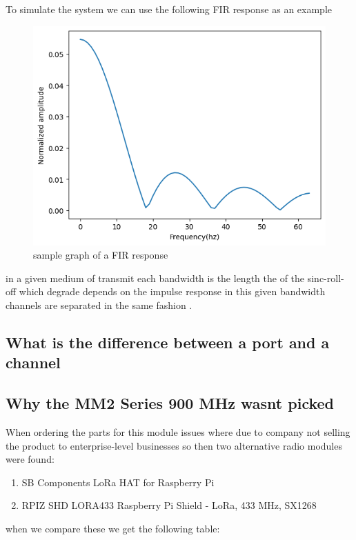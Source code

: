 To simulate the system we can use the following FIR response  as an example 
\begin{figure}[h!]
    \includegraphics[width=0.5\linewidth]{Images/FIR_response.png}
    \caption{sample graph of a FIR response}
    \label{sample graph of a FIR response}

\end{figure}
in a given  medium  of  transmit each bandwidth is the length the of the  sinc-roll-off which degrade depends on the  impulse response in this given bandwidth channels are separated in the same fashion .
\subsection{What is  the difference  between a  port and a channel}

\newpage
\subsection{Why the MM2 Series 900 MHz wasnt picked}
When ordering the parts for  this module issues where due to company not selling the product to  enterprise-level businesses so then two alternative radio modules were found:
\begin{enumerate}
    \item SB Components LoRa HAT for Raspberry Pi
    \item RPIZ SHD LORA433 Raspberry Pi Shield - LoRa, 433 MHz, SX1268
\end{enumerate}
when we compare these we get the following table:

